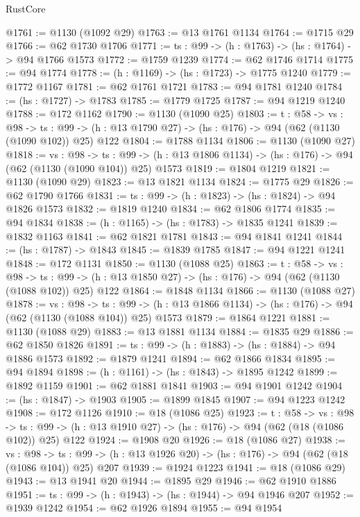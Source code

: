 \begin{lexlean}{RustCore}
\begin{coremodule}
@1761 := @1130 (@1092 @29)
@1763 := @13 @1761 @1134
@1764 := @1715 @29
@1766 := @62 @1730 @1706
@1771 := {ts : @99} -> (h : @1763) -> (hs : @1764) -> @94 @1766 @1573
@1772 := @1759 @1239
@1774 := @62 @1746 @1714
@1775 := @94 @1774
@1778 := (h : @1169) -> (hs : @1723) -> @1775 @1240
@1779 := @1772 @1167
@1781 := @62 @1761 @1721
@1783 := @94 @1781 @1240
@1784 := (hs : @1727) -> @1783
@1785 := @1779 @1725
@1787 := @94 @1219 @1240
@1788 := @172 @1162
@1790 := @1130 (@1090 @25)
@1803 := {t : @58} ->
  {vs : @98} ->
  {ts : @99} -> (h : @13 @1790 @27) -> (hs : @176) -> @94 (@62 (@1130 (@1090 @102)) @25) @122
@1804 := @1788 @1134
@1806 := @1130 (@1090 @27)
@1818 := {vs : @98} ->
  {ts : @99} -> (h : @13 @1806 @1134) -> (hs : @176) -> @94 (@62 (@1130 (@1090 @104)) @25) @1573
@1819 := @1804 @1219
@1821 := @1130 (@1090 @29)
@1823 := @13 @1821 @1134
@1824 := @1775 @29
@1826 := @62 @1790 @1766
@1831 := {ts : @99} -> (h : @1823) -> (hs : @1824) -> @94 @1826 @1573
@1832 := @1819 @1240
@1834 := @62 @1806 @1774
@1835 := @94 @1834
@1838 := (h : @1165) -> (hs : @1783) -> @1835 @1241
@1839 := @1832 @1163
@1841 := @62 @1821 @1781
@1843 := @94 @1841 @1241
@1844 := (hs : @1787) -> @1843
@1845 := @1839 @1785
@1847 := @94 @1221 @1241
@1848 := @172 @1131
@1850 := @1130 (@1088 @25)
@1863 := {t : @58} ->
  {vs : @98} ->
  {ts : @99} -> (h : @13 @1850 @27) -> (hs : @176) -> @94 (@62 (@1130 (@1088 @102)) @25) @122
@1864 := @1848 @1134
@1866 := @1130 (@1088 @27)
@1878 := {vs : @98} ->
  {ts : @99} -> (h : @13 @1866 @1134) -> (hs : @176) -> @94 (@62 (@1130 (@1088 @104)) @25) @1573
@1879 := @1864 @1221
@1881 := @1130 (@1088 @29)
@1883 := @13 @1881 @1134
@1884 := @1835 @29
@1886 := @62 @1850 @1826
@1891 := {ts : @99} -> (h : @1883) -> (hs : @1884) -> @94 @1886 @1573
@1892 := @1879 @1241
@1894 := @62 @1866 @1834
@1895 := @94 @1894
@1898 := (h : @1161) -> (hs : @1843) -> @1895 @1242
@1899 := @1892 @1159
@1901 := @62 @1881 @1841
@1903 := @94 @1901 @1242
@1904 := (hs : @1847) -> @1903
@1905 := @1899 @1845
@1907 := @94 @1223 @1242
@1908 := @172 @1126
@1910 := @18 (@1086 @25)
@1923 := {t : @58} ->
  {vs : @98} ->
  {ts : @99} -> (h : @13 @1910 @27) -> (hs : @176) -> @94 (@62 (@18 (@1086 @102)) @25) @122
@1924 := @1908 @20
@1926 := @18 (@1086 @27)
@1938 := {vs : @98} ->
  {ts : @99} -> (h : @13 @1926 @20) -> (hs : @176) -> @94 (@62 (@18 (@1086 @104)) @25) @207
@1939 := @1924 @1223
@1941 := @18 (@1086 @29)
@1943 := @13 @1941 @20
@1944 := @1895 @29
@1946 := @62 @1910 @1886
@1951 := {ts : @99} -> (h : @1943) -> (hs : @1944) -> @94 @1946 @207
@1952 := @1939 @1242
@1954 := @62 @1926 @1894
@1955 := @94 @1954

\end{coremodule}
\end{lexlean}
